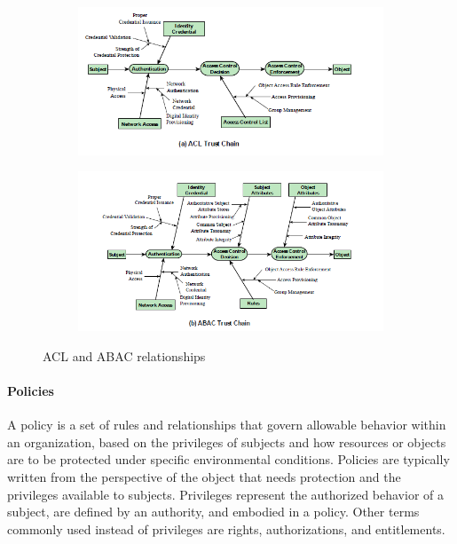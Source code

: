 \documentclass{article}
\begin{document}
                \begin{figure}[h]
                    \centering
                    \begin{subfigure}
                        \centering
                        \includegraphics[scale=0.8]{../immagini/ACLRelation.png}
                    \end{subfigure}
                    \vspace{1cm}
                    \begin{subfigure}
                        \centering
                        \includegraphics[scale=0.8]{../immagini/ABACRelation.png}
                    \end{subfigure}
                    \caption{ACL and ABAC
                    relationships}
                \end{figure}

            \paragraph{Policies}

            A policy is a set of rules and relationships that govern allowable behavior within an organization, based on the privileges of subjects and how resources or objects are to be protected under specific environmental conditions. Policies are typically written from the perspective of the object that needs protection and the privileges available to subjects. Privileges represent the authorized behavior of a subject, are defined by an authority, and embodied in a policy. Other terms commonly used instead of privileges are rights, authorizations, and entitlements.
\end{document}
